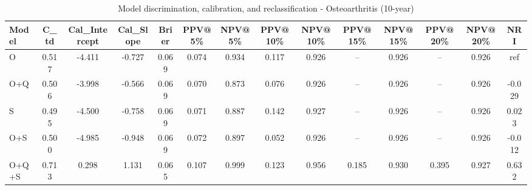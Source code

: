 \begin{table}[htbp]
\centering
\small
\caption{Model discrimination, calibration, and reclassification - Osteoarthritis (10-year)}
\label{tab:perf_osteoarthritis_10y}
\begin{tabular}{lccccccccccccc}
\toprule
Model & C\_td & Cal\_Intercept & Cal\_Slope & Brier & PPV@5\% & NPV@5\% & PPV@10\% & NPV@10\% & PPV@15\% & NPV@15\% & PPV@20\% & NPV@20\% & NRI \\
\midrule
O & 0.517 & -4.411 & -0.727 & 0.069 & 0.074 & 0.934 & 0.117 & 0.926 & -- & 0.926 & -- & 0.926 & ref \\
O+Q & 0.506 & -3.998 & -0.566 & 0.069 & 0.070 & 0.873 & 0.076 & 0.926 & -- & 0.926 & -- & 0.926 & -0.029 \\
S & 0.495 & -4.500 & -0.758 & 0.069 & 0.071 & 0.887 & 0.142 & 0.927 & -- & 0.926 & -- & 0.926 & 0.023 \\
O+S & 0.500 & -4.985 & -0.948 & 0.069 & 0.072 & 0.897 & 0.052 & 0.926 & -- & 0.926 & -- & 0.926 & -0.012 \\
O+Q+S & 0.713 & 0.298 & 1.131 & 0.065 & 0.107 & 0.999 & 0.123 & 0.956 & 0.185 & 0.930 & 0.395 & 0.927 & 0.632 \\
\bottomrule
\end{tabular}
\end{table}